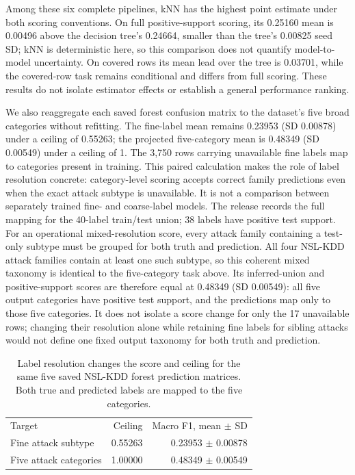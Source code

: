 \documentclass[namedate,webpdf,contemporary,large]{TBench-template}
\begin{document}
Among these six complete pipelines, kNN has the highest point estimate under both scoring conventions. On full positive-support scoring, its 0.25160 mean is 0.00496 above the decision tree's 0.24664, smaller than the tree's 0.00825 seed SD; kNN is deterministic here, so this comparison does not quantify model-to-model uncertainty. On covered rows its mean lead over the tree is 0.03701, while the covered-row task remains conditional and differs from full scoring. These results do not isolate estimator effects or establish a general performance ranking.

We also reaggregate each saved forest confusion matrix to the dataset's five broad categories without refitting. The fine-label mean remains 0.23953 (SD 0.00878) under a ceiling of 0.55263; the projected five-category mean is 0.48349 (SD 0.00549) under a ceiling of 1. The 3,750 rows carrying unavailable fine labels map to categories present in training. This paired calculation makes the role of label resolution concrete: category-level scoring accepts correct family predictions even when the exact attack subtype is unavailable. It is not a comparison between separately trained fine- and coarse-label models. The release records the full mapping for the 40-label train/test union; 38 labels have positive test support. For an operational mixed-resolution score, every attack family containing a test-only subtype must be grouped for both truth and prediction. All four NSL-KDD attack families contain at least one such subtype, so this coherent mixed taxonomy is identical to the five-category task above. Its inferred-union and positive-support scores are therefore equal at 0.48349 (SD 0.00549): all five output categories have positive test support, and the predictions map only to those five categories. It does not isolate a score change for only the 17 unavailable rows; changing their resolution alone while retaining fine labels for sibling attacks would not define one fixed output taxonomy for both truth and prediction.

\begin{table}[h]\centering
\caption{Label resolution changes the score and ceiling for the same five saved NSL-KDD forest prediction matrices. Both true and predicted labels are mapped to the five categories.}
\begin{tabular}{lrr}
Target & Ceiling & Macro F1, mean $\pm$ SD\\
Fine attack subtype & 0.55263 & 0.23953 $\pm$ 0.00878\\
Five attack categories & 1.00000 & 0.48349 $\pm$ 0.00549\\
\end{tabular}\end{table}
\end{document}
